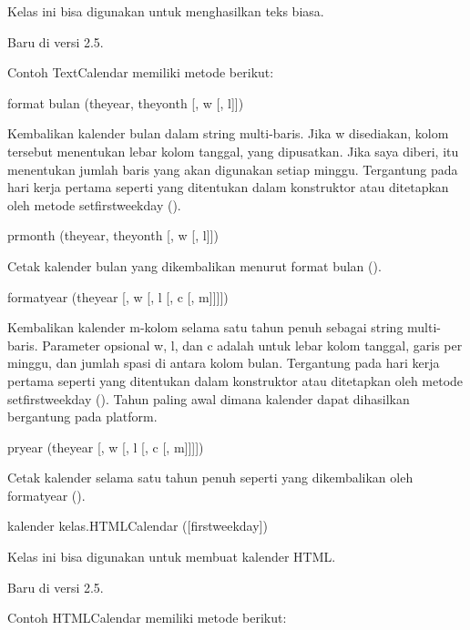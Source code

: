 \noindent 
Kelas ini bisa digunakan untuk menghasilkan teks biasa. \par
\vspace{12pt}
\noindent 
Baru di versi 2.5. \par
\vspace{12pt}
\noindent 
Contoh TextCalendar memiliki metode berikut: \par
\vspace{12pt}
\noindent 
format bulan (theyear, theyonth [, w [, l]]) \par
\noindent 
Kembalikan kalender bulan dalam string multi-baris. Jika w disediakan, kolom tersebut menentukan lebar kolom tanggal, yang dipusatkan. Jika saya diberi, itu menentukan jumlah baris yang akan digunakan setiap minggu. Tergantung pada hari kerja pertama seperti yang ditentukan dalam konstruktor atau ditetapkan oleh metode setfirstweekday (). \par
\vspace{12pt}
\noindent 
prmonth (theyear, theyonth [, w [, l]]) \par
\noindent 
Cetak kalender bulan yang dikembalikan menurut format bulan (). \par
\vspace{12pt}
\noindent 
formatyear (theyear [, w [, l [, c [, m]]]]) \par
\noindent 
Kembalikan kalender m-kolom selama satu tahun penuh sebagai string multi-baris. Parameter opsional w, l, dan c adalah untuk lebar kolom tanggal, garis per minggu, dan jumlah spasi di antara kolom bulan. Tergantung pada hari kerja pertama seperti yang ditentukan dalam konstruktor atau ditetapkan oleh metode setfirstweekday (). Tahun paling awal dimana kalender dapat dihasilkan bergantung pada platform. \par
\vspace{12pt}
\noindent 
pryear (theyear [, w [, l [, c [, m]]]]) \par
\noindent 
Cetak kalender selama satu tahun penuh seperti yang dikembalikan oleh formatyear (). \par
\vspace{12pt}
\noindent 
kalender kelas.HTMLCalendar ([firstweekday]) \par
\noindent 
Kelas ini bisa digunakan untuk membuat kalender HTML. \par
\vspace{12pt}
\noindent 
Baru di versi 2.5. \par
\vspace{12pt}
\noindent 
Contoh HTMLCalendar memiliki metode berikut: \par
